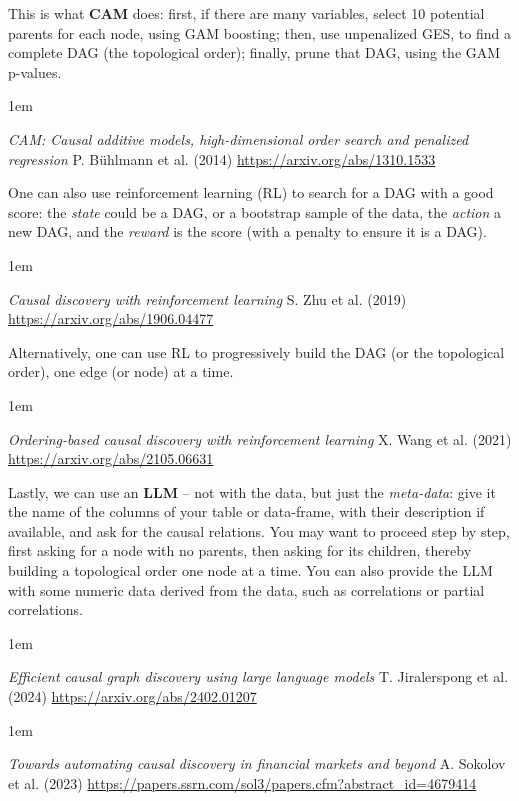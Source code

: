 \documentclass[a5paper]{article}
\let\d\textbf
\newenvironment{reference}{%
  \medskip\goodbreak
  \parskip 0pt
  \raggedright
  \leftskip 1em
  \obeylines
}{\par\medskip\goodbreak}
\begin{document}
This is what \d{CAM} does:
first, if there are many variables, select 10 potential parents for each node, using GAM boosting;
then, use unpenalized GES, to find a complete DAG (the topological order);
finally, prune that DAG, using the GAM p-values.

\begin{reference}
  \emph{CAM: Causal additive models, high-dimensional order search and penalized regression}
  P. Bühlmann et al. (2014)
  \url{https://arxiv.org/abs/1310.1533}
\end{reference}

One can also use reinforcement learning (RL) to search for a DAG with a good score:
the \emph{state} could be a DAG, or a bootstrap sample of the data,
the \emph{action} a new DAG,
and the \emph{reward} is the score (with a penalty to ensure it is a DAG).

\begin{reference}
  \emph{Causal discovery with reinforcement learning}
  S. Zhu et al. (2019)
  \url{https://arxiv.org/abs/1906.04477}
\end{reference}

Alternatively, one can use RL to progressively build the DAG (or the topological order),
one edge (or node) at a time.

\begin{reference}
  \emph{Ordering-based causal discovery with reinforcement learning}
  X. Wang et al. (2021)
  \url{https://arxiv.org/abs/2105.06631}
\end{reference}

Lastly, we can use an \d{LLM} -- not with the data, but just the \emph{meta-data}:
give it the name of the columns of your table or data-frame,
with their description if available, and ask for the causal relations.
You may want to proceed step by step, first asking for a node with no parents,
then asking for its children, thereby building a topological order one node at a time.
You can also provide the LLM with some numeric data derived from the data,
such as correlations or partial correlations.

\begin{reference}
  \emph{Efficient causal graph discovery using large language models}
  T. Jiralerspong et al. (2024)
  \url{https://arxiv.org/abs/2402.01207}
\end{reference}

\begin{reference}
  \emph{Towards automating causal discovery in financial markets and beyond}
  A. Sokolov et al. (2023)
  \url{https://papers.ssrn.com/sol3/papers.cfm?abstract_id=4679414}
\end{reference}
\end{document}
